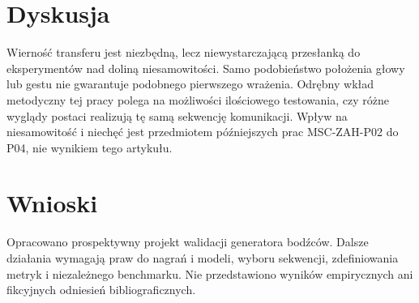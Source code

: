 \documentclass[11pt,a4paper]{article}
\begin{document}
\section{Dyskusja}
Wierność transferu jest niezbędną, lecz niewystarczającą przesłanką do eksperymentów nad doliną niesamowitości. Samo podobieństwo położenia głowy lub gestu nie gwarantuje podobnego pierwszego wrażenia. Odrębny wkład metodyczny tej pracy polega na możliwości ilościowego testowania, czy różne wyglądy postaci realizują tę samą sekwencję komunikacji. Wpływ na niesamowitość i niechęć jest przedmiotem późniejszych prac MSC-ZAH-P02 do P04, nie wynikiem tego artykułu.
\section{Wnioski}
Opracowano prospektywny projekt walidacji generatora bodźców. Dalsze działania wymagają praw do nagrań i modeli, wyboru sekwencji, zdefiniowania metryk i niezależnego benchmarku. Nie przedstawiono wyników empirycznych ani fikcyjnych odniesień bibliograficznych.
\end{document}
